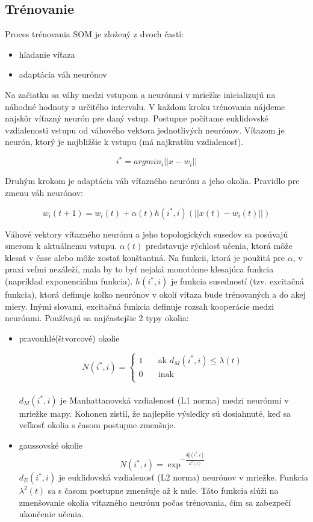 \subsection{Trénovanie}
Proces trénovania SOM je zložený z dvoch častí:
\begin{itemize}
\item hľadanie víťaza
\item adaptácia váh neurónov
\end{itemize}
Na začiatku sa váhy medzi vstupom a neurónmi v mriežke inicializujú na náhodné hodnoty z určitého intervalu.
V každom kroku trénovania nájdeme najskôr víťazný neurón pre daný vstup. Postupne počítame euklidovské vzdialenosti vstupu od váhového vektora jednotlivých neurónov. Víťazom je neurón, ktorý je najbližšie k vstupu (má najkratšiu vzdialenosť).

\begin{equation}
i^* = argmin_i||x-w_i|| 
\end{equation}

Druhým krokom je adaptácia váh víťazného neurónu a jeho okolia. Pravidlo pre zmenu váh neurónov:

\begin{equation}
w_i(t+1) = w_i(t) + \alpha(t)h(i^*, i)(||x(t) - w_i(t)||)
\end{equation}

Váhové vektory víťazného neurónu a jeho topologických susedov sa posúvajú smerom k aktuálnemu vstupu.
$\alpha(t)$ predstavuje rýchlosť učenia, ktorá môže klesať v čase alebo môže zostať konštantná. Na funkcii, ktorá je použitá pre $\alpha$, v praxi veľmi nezáleží, mala by to byť nejaká monotónne klesajúca funkcia (napríklad exponenciálna funkcia). 
$h(i^*, i)$ je funkcia susedností (tzv. excitačná funkcia), ktorá definuje koľko neurónov v okolí víťaza bude trénovaných a do akej miery. Inými slovami, excitačná funkcia definuje rozsah kooperácie medzi neurónmi. Používajú sa najčastejšie 2 typy okolia:
\begin{itemize}
\item pravouhlé(štvorcové) okolie

\[
N(i^{*},i) =
     \begin{cases}
       \text{1} &\quad\text{ak } d_{M}(i^*, i) \leq \lambda(t) \\
       \text{0} &\quad\text{inak}\\
     \end{cases}
\]
\\
$d_{M}(i^{*}, i)$ je Manhattanovská vzdialenosť (L1 norma) medzi neurónmi v mriežke mapy. Kohonen zistil, že najlepšie výsledky sú dosiahnuté, keď
sa veľkosť okolia s časom postupne zmenšuje.
\item gaussovské okolie
	\begin{equation}
		N(i^{*}, i) = \exp^{- \frac{d^{2}_{E}(i^{*}, i)}{\lambda^{2}(t)}}
	\end{equation}
$d_{E}(i^{*}, i)$ je euklidovská vzdialenosť (L2 norma) neurónov v mriežke. Funkcia $\lambda^2(t)$ sa s časom postupne zmenšuje až k nule. Táto
	funkcia slúži na zmenšovanie okolia víťazného neurónu počas trénovania, čím sa zabezpečí ukončenie učenia.
\end{itemize}

